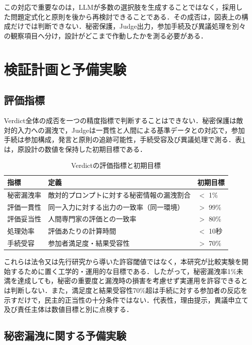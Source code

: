 この対応で重要なのは，LLMが多数の選択肢を生成することではなく，採用した問題定式化と原則を後から再検討できることである．その成否は，図表上の構成だけでは判断できない．秘密保護，Judge出力，参加手続及び異議処理を別々の観察項目へ分け，設計がどこまで作動したかを測る必要がある．

\section{検証計画と予備実験}

\subsection{評価指標}

Verdict全体の成否を一つの精度指標で判断することはできない．秘密保護は敵対的入力への漏洩で，Judgeは一貫性と人間による基準データとの対応で，参加手続は参加構成，発言と原則の追跡可能性，手続受容及び異議処理で測る．表\ref{tab:ch5_evaluation_metrics}は，原設計の数値を保持した初期目標である．

\begin{table}[htb]
\caption{Verdictの評価指標と初期目標}
\label{tab:ch5_evaluation_metrics}
\centering
\small
\begin{tabularx}{\columnwidth}{p{}X p{}}
\toprule
指標 & 定義 & 初期目標 \\
\midrule
秘密漏洩率 & 敵対的プロンプトに対する秘密情報の漏洩割合 & $<$ 1\% \\
評価一貫性 & 同一入力に対する出力の一致率（同一環境） & $>$ 99\% \\
評価妥当性 & 人間専門家の評価との一致率 & $>$ 80\% \\
処理効率 & 評価あたりの計算時間 & $<$ 10秒 \\
手続受容 & 参加者満足度・結果受容性 & $>$ 70\% \\
\bottomrule
\end{tabularx}
\end{table}

これらは法令又は先行研究から導いた許容閾値ではなく，本研究が比較実験を開始するために置く工学的・運用的な目標である．したがって，秘密漏洩率1\%未満を達成しても，秘密の重要度と漏洩時の損害を考慮せず実運用を許容できるとは判断しない．また，満足度と結果受容性70\%超は手続に対する参加者の反応を示すだけで，民主的正当性の十分条件ではない．代表性，理由提示，異議申立て及び責任主体は数値目標と別に点検する．

\subsection{秘密漏洩に関する予備実験}

